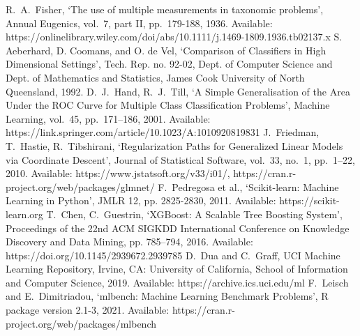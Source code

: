 \clearpage
{}
\begin{thebibliography}{99}
R.\ A.\ Fisher, `The use of multiple measurements in taxonomic problems', Annual Eugenics, vol.\ 7, part II, pp.\ 179-188, 1936. Available: https://onlinelibrary.wiley.com/doi/abs/10.1111/j.1469-1809.1936.tb02137.x
%
S. Aeberhard, D. Coomans, and O. de Vel, `Comparison of Classifiers in High Dimensional Settings', Tech. Rep. no. 92-02, Dept. of Computer Science and Dept. of Mathematics and Statistics, James Cook University of North Queensland, 1992. 
%
D.\ J.\ Hand, R.\ J.\ Till, `A Simple Generalisation of the Area Under the ROC Curve for Multiple Class Classification Problems', Machine Learning, vol.\ 45, pp.\ 171--186, 2001. Available: https://link.springer.com/article/10.1023/A:1010920819831
%
J.\ Friedman, T.\ Hastie, R.\ Tibshirani, `Regularization Paths for Generalized Linear Models via Coordinate Descent', Journal of Statistical Software, vol.\ 33, no.\ 1, pp.\ 1--22, 2010. Available: https://www.jstatsoft.org/v33/i01/, https://cran.r-project.org/web/packages/glmnet/
%
F.\ Pedregosa et al., `Scikit-learn: Machine Learning in Python', JMLR 12, pp. 2825-2830, 2011. Available: https://scikit-learn.org
%
T.\ Chen, C.\ Guestrin, `XGBoost: A Scalable Tree Boosting System', Proceedings of the 22nd ACM SIGKDD International Conference on Knowledge Discovery and Data Mining, pp. 785--794, 2016. Available: https://doi.org/10.1145/2939672.2939785
%
D.\ Dua and C.\ Graff, UCI Machine Learning Repository, Irvine, CA: University of California, School of Information and Computer Science, 2019. Available: https://archive.ics.uci.edu/ml
%
F.\ Leisch and E.\ Dimitriadou, `mlbench: Machine Learning Benchmark Problems', R package version 2.1-3, 2021. Available: https://cran.r-project.org/web/packages/mlbench
\end{thebibliography}
\endinput
